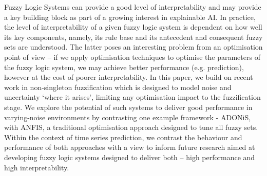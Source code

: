 

Fuzzy Logic Systems can provide a good level of interpretability and may provide a key building block as part of a growing interest in explainable AI. In practice, the level of interpretability of a given fuzzy logic system is dependent on how well its key components, namely, its rule base and its antecedent and consequent fuzzy sets are understood. The latter poses an interesting problem from an optimisation point of view -- if we apply optimisation techniques to optimise the parameters of the fuzzy logic system, we may achieve better performance (e.g. prediction), however at the cost of poorer interpretability. In this paper, we build on recent work in non-singleton fuzzification which is designed to model noise and uncertainty `where it arises', limiting any optimisation impact to the fuzzification stage. We explore the potential of such systems to deliver good performance in varying-noise environments by contrasting one example framework - ADONiS, with ANFIS, a traditional optimisation approach designed to tune all fuzzy sets. Within the context of time series prediction, we contrast the behaviour and performance of both approaches with a view to inform future research aimed at developing fuzzy logic systems designed to deliver both -- high performance and high interpretability. 


